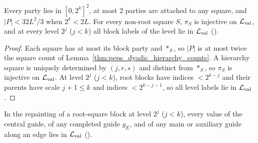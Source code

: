 \begin{lemma}
    \label{thm:peps_dyadic_protocol_parties}
    \leanok
    Every party lies in $[0,2^k]^2$, at most $2$ parties are attached to any
    square, and $|P|<32L^2/3$ when $2^k<2L$. For every non-root square $S$,
    $\pi_S$ is injective on $\mathcal L_{\rm val}$, and at every level $2^j$
    ($j<k$) all block labels of the level lie in $\mathcal L_{\rm val}$
    (\cite[Proposition~7.1, item~1]{OpenAI2026PolynomialPEPS}).
\end{lemma}

\begin{proof}\leanok
    Each square has at most its block party and $\ast_S$, so $|P|$ is at most twice
    the square count of Lemma~\ref{thm:peps_dyadic_hierarchy_counts}. A hierarchy
    square is uniquely determined by $(j,r,s)$ and distinct from $\ast_S$, so
    $\pi_S$ is injective on $\mathcal L_{\rm val}$. At level $2^j$ ($j<k$), root
    blocks have indices $<2^{k-j}$ and their parents have scale $j+1\le k$ and
    indices $<2^{k-j-1}$, so all level labels lie in $\mathcal L_{\rm val}$.
\end{proof}

\begin{lemma}
    \label{thm:peps_dyadic_repainting_valid_labels}
    \leanok
    In the repainting of a root-square block at level $2^j$ ($j<k$), every value of
    the central guide, of any completed guide $g_E$, and of any main or auxiliary
    guide along an edge lies in $\mathcal L_{\rm val}$
    (\cite[\texttt{06-geometry.tex}, lines 82--100, 585--609]{OpenAI2026PolynomialPEPS}).
\end{lemma}

